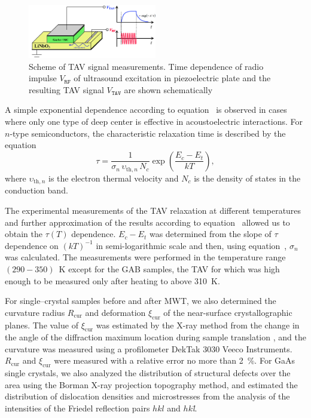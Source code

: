 \documentclass[10pt]{iopart}
\begin{document}
\begin{figure}
\includegraphics[width=0.5\textwidth]{fig2}
\caption{\label{figTAV}
Scheme of TAV signal  measurements.
Time dependence of radio impulse $V_\mathtt{RF}$ of ultrasound excitation in piezoelectric plate and the resulting TAV signal $V_\mathtt{TAV}$ are shown schematically
}%
\end{figure}

A simple exponential dependence according to equation~ is observed in cases where only one type of deep center is effective in acoustoelectric interactions.
For $n$-type semiconductors, the characteristic relaxation time is described by the equation \cite{OstrovPAN,OstrovskiiSST}
\begin{equation}\label{eqPANtau}
  \tau=\frac{1}{\sigma_n\,\upsilon_{\mathrm{th},n}\,N_c}\exp\left(\frac{E_c-E_t}{kT}\right),
\end{equation}
where
$\upsilon_{\mathrm{th},n}$ is the electron thermal velocity and
$N_c$ is the density of states in the conduction band.



The experimental measurements of the TAV relaxation at different temperatures and further approximation of the results according
to equation~
allowed us to obtain the $\tau(T)$ dependence.
$E_c-E_t$ was determined from the slope of $\tau$ dependence on $(kT)^{-1}$ in semi-logarithmic scale
and then, using equation~, $\sigma_n$ was calculated.
The measurements were performed in the temperature range $(290-350)$~K except for the GAB samples,
the TAV for which was high enough to be measured only after heating to above 310~K.

For single--crystal samples  before and after MWT, we also determined the curvature radius $R_\mathrm{cur}$
and deformation $\xi_\mathrm{cur}$ of the near-surface crystallographic planes.
The value of  $\xi_\mathrm{cur}$ was estimated by the X-ray method from the change in the angle of the diffraction
maximum location  during sample translation \cite{Godwod},
and the curvature was measured using a profilometer DekTak 3030 Veeco Instruments.
$R_\mathrm{cur}$ and $\xi_\mathrm{cur}$ were measured with a relative error no more than 2~\%.
For GaAs single crystals, we also analyzed the distribution of structural defects over the area using the Borman X-ray projection topography method, and estimated the distribution of dislocation  densities and microstresses from the
analysis of the intensities of the Friedel reflection pairs $hkl$ and $hk$\emph{\={l}}.
\end{document}
